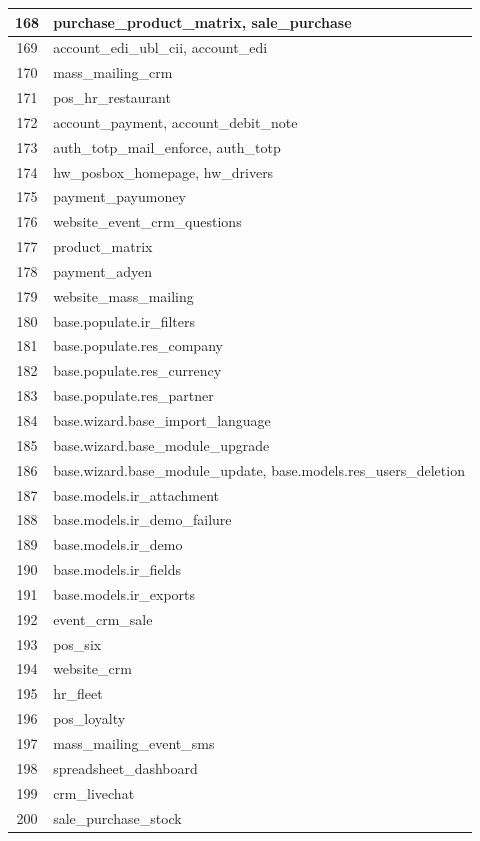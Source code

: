\begin{small}
\begin{longtable}{|c|p{14cm}|}
168 & purchase{\_}product{\_}matrix, sale{\_}purchase \\ \hline
169 & account{\_}edi{\_}ubl{\_}cii, account{\_}edi \\ \hline
170 & mass{\_}mailing{\_}crm \\ \hline
171 & pos{\_}hr{\_}restaurant \\ \hline
172 & account{\_}payment, account{\_}debit{\_}note \\ \hline
173 & auth{\_}totp{\_}mail{\_}enforce, auth{\_}totp \\ \hline
174 & hw{\_}posbox{\_}homepage, hw{\_}drivers \\ \hline
175 & payment{\_}payumoney \\ \hline
176 & website{\_}event{\_}crm{\_}questions \\ \hline
177 & product{\_}matrix \\ \hline
178 & payment{\_}adyen \\ \hline
179 & website{\_}mass{\_}mailing \\ \hline
180 & base.populate.ir{\_}filters \\ \hline
181 & base.populate.res{\_}company \\ \hline
182 & base.populate.res{\_}currency \\ \hline
183 & base.populate.res{\_}partner \\ \hline
184 & base.wizard.base{\_}import{\_}language \\ \hline
185 & base.wizard.base{\_}module{\_}upgrade \\ \hline
186 & base.wizard.base{\_}module{\_}update, base.models.res{\_}users{\_}deletion \\ \hline
187 & base.models.ir{\_}attachment \\ \hline
188 & base.models.ir{\_}demo{\_}failure \\ \hline
189 & base.models.ir{\_}demo \\ \hline
190 & base.models.ir{\_}fields \\ \hline
191 & base.models.ir{\_}exports \\ \hline
192 & event{\_}crm{\_}sale \\ \hline
193 & pos{\_}six \\ \hline
194 & website{\_}crm \\ \hline
195 & hr{\_}fleet \\ \hline
196 & pos{\_}loyalty \\ \hline
197 & mass{\_}mailing{\_}event{\_}sms \\ \hline
198 & spreadsheet{\_}dashboard \\ \hline
199 & crm{\_}livechat \\ \hline
200 & sale{\_}purchase{\_}stock \\ \hline
\end{longtable}
\end{small}
\endgroup



